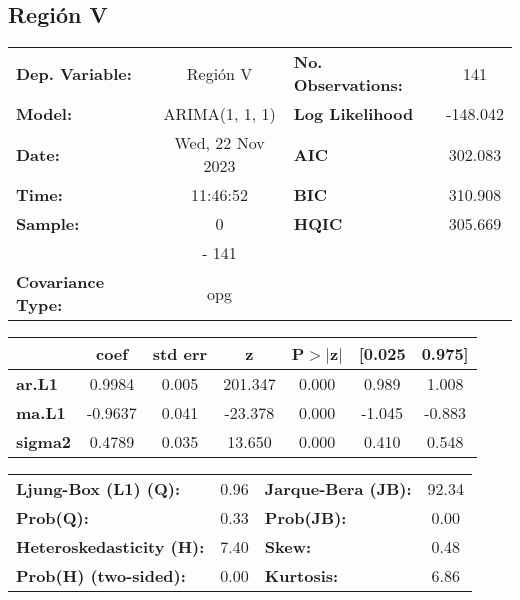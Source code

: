 \documentclass{article}%
\begin{document}
\subsection*{Región V}%
\begin{center}
\begin{tabular}{lclc}
\toprule
\textbf{Dep. Variable:}          &     Región V     & \textbf{  No. Observations:  } &    141      \\
\textbf{Model:}                  &  ARIMA(1, 1, 1)  & \textbf{  Log Likelihood     } &  -148.042   \\
\textbf{Date:}                   & Wed, 22 Nov 2023 & \textbf{  AIC                } &  302.083    \\
\textbf{Time:}                   &     11:46:52     & \textbf{  BIC                } &  310.908    \\
\textbf{Sample:}                 &        0         & \textbf{  HQIC               } &  305.669    \\
\textbf{}                        &       - 141      & \textbf{                     } &             \\
\textbf{Covariance Type:}        &       opg        & \textbf{                     } &             \\
\bottomrule
\end{tabular}
\begin{tabular}{lcccccc}
                & \textbf{coef} & \textbf{std err} & \textbf{z} & \textbf{P$> |$z$|$} & \textbf{[0.025} & \textbf{0.975]}  \\
\midrule
\textbf{ar.L1}  &       0.9984  &        0.005     &   201.347  &         0.000        &        0.989    &        1.008     \\
\textbf{ma.L1}  &      -0.9637  &        0.041     &   -23.378  &         0.000        &       -1.045    &       -0.883     \\
\textbf{sigma2} &       0.4789  &        0.035     &    13.650  &         0.000        &        0.410    &        0.548     \\
\bottomrule
\end{tabular}
\begin{tabular}{lclc}
\textbf{Ljung-Box (L1) (Q):}     & 0.96 & \textbf{  Jarque-Bera (JB):  } & 92.34  \\
\textbf{Prob(Q):}                & 0.33 & \textbf{  Prob(JB):          } &  0.00  \\
\textbf{Heteroskedasticity (H):} & 7.40 & \textbf{  Skew:              } &  0.48  \\
\textbf{Prob(H) (two-sided):}    & 0.00 & \textbf{  Kurtosis:          } &  6.86  \\
\bottomrule
\end{tabular}
\end{center}
\end{document}
